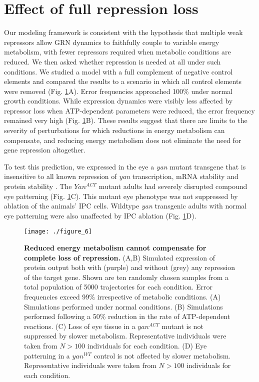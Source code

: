 \section{Effect of full repression loss}

Our modeling framework is consistent with the hypothesis that multiple weak repressors allow GRN dynamics to faithfully couple to variable energy metabolism, with fewer repressors required when metabolic conditions are reduced. We then asked whether repression is needed at all under such conditions. We studied a model with a full complement of negative control elements and compared the results to a scenario in which all control elements were removed (Fig. \ref{fig:metabolism:fig6}A). Error frequencies approached 100\% under normal growth conditions. While expression dynamics were visibly less affected by repressor loss when ATP-dependent parameters were reduced, the error frequency remained very high (Fig. \ref{fig:metabolism:fig6}B). These results suggest that there are limits to the severity of perturbations for which reductions in energy metabolism can compensate, and reducing energy metabolism does not eliminate the need for gene repression altogether.

To test this prediction, we expressed in the eye a \textit{yan} mutant transgene that is insensitive to all known repression of \textit{yan} transcription, mRNA stability and protein stability \cite{Rebay1995}. The $Yan^{ACT}$ mutant adults had severely disrupted compound eye patterning (Fig. \ref{fig:metabolism:fig6}C). This mutant eye phenotype was not suppressed by ablation of the animals' IPC cells. Wildtype \textit{yan} transgenic adults with normal eye patterning were also unaffected by IPC ablation (Fig. \ref{fig:metabolism:fig6}D).

\begin{figure}[h!]
\centering
\texttt{[image: ./figure\_6]}
\caption[Reduced metabolism cannot compensate for complete loss of repression.]{\textbf{Reduced energy metabolism cannot compensate for complete loss of repression.} (A,B) Simulated expression of protein output both with (purple) and without (grey) any repression of the target gene. Shown are ten randomly chosen samples from a total population of 5000 trajectories for each condition. Error frequencies exceed 99\% irrespective of metabolic conditions. (A) Simulations performed under normal conditions. (B) Simulations performed following a 50\% reduction in the rate of ATP-dependent reactions. (C) Loss of eye tissue in a $yan^{ACT}$ mutant is not suppressed by slower metabolism. Representative individuals were taken from $N>100$ individuals for each condition. (D) Eye patterning in a $yan^{WT}$ control is not affected by slower metabolism. Representative individuals were taken from $N>100$ individuals for each condition.}
\label{fig:metabolism:fig6}
\end{figure}

